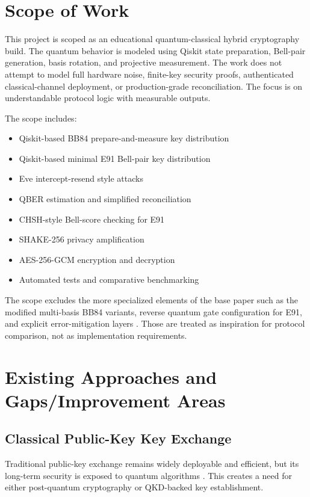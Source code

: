 \documentclass[conference]{IEEEtran}
\begin{document}
\section{Scope of Work}
This project is scoped as an educational quantum-classical hybrid cryptography build. The quantum behavior is modeled using Qiskit state preparation, Bell-pair generation, basis rotation, and projective measurement. The work does not attempt to model full hardware noise, finite-key security proofs, authenticated classical-channel deployment, or production-grade reconciliation. The focus is on understandable protocol logic with measurable outputs.

The scope includes:
\begin{itemize}
\item Qiskit-based BB84 prepare-and-measure key distribution
\item Qiskit-based minimal E91 Bell-pair key distribution
\item Eve intercept-resend style attacks
\item QBER estimation and simplified reconciliation
\item CHSH-style Bell-score checking for E91
\item SHAKE-256 privacy amplification
\item AES-256-GCM encryption and decryption
\item Automated tests and comparative benchmarking
\end{itemize}

The scope excludes the more specialized elements of the base paper such as the modified multi-basis BB84 variants, reverse quantum gate configuration for E91, and explicit error-mitigation layers \cite{ain2025novel}. Those are treated as inspiration for protocol comparison, not as implementation requirements.

\section{Existing Approaches and Gaps/Improvement Areas}
\subsection{Classical Public-Key Key Exchange}
Traditional public-key exchange remains widely deployable and efficient, but its long-term security is exposed to quantum algorithms \cite{shor1997polynomial}. This creates a need for either post-quantum cryptography or QKD-backed key establishment.
\end{document}
